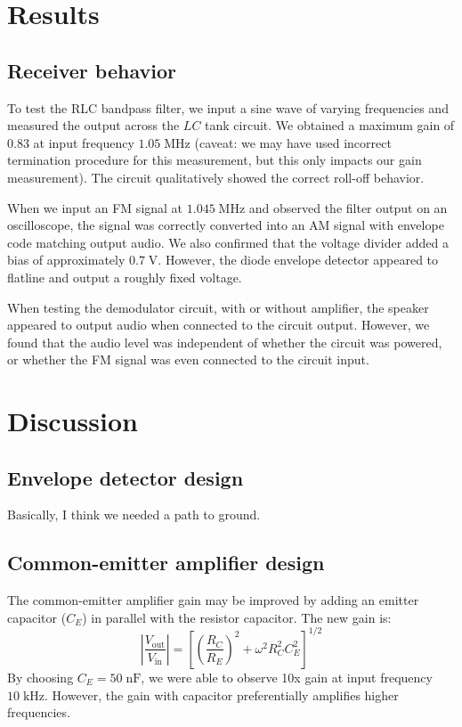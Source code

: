 \documentclass[11pt]{article}
\newcommand {\mt}{\mathrm}
\newcommand {\unit}[1]{\; \mt{#1}}
\begin{document}
\section{Results}

\subsection{Receiver behavior}

To test the RLC bandpass filter, we input a sine wave of varying frequencies
and measured the output across the $LC$ tank circuit.  We obtained a maximum
gain of $0.83$ at input frequency $1.05 \unit{MHz}$ (caveat: we may have used
incorrect termination procedure for this measurement, but this only impacts our
gain measurement).  The circuit qualitatively showed the correct roll-off
behavior.

When we input an FM signal at $1.045 \unit{MHz}$ and observed the
filter output on an oscilloscope, the signal was correctly converted into
an AM signal with envelope code matching output audio.  We also confirmed that
the voltage divider added a bias of approximately $0.7 \unit{V}$.
However, the diode envelope detector appeared to flatline and output a roughly
fixed voltage.

When testing the demodulator circuit, with or without amplifier, the speaker
appeared to output audio when connected to the circuit output.  However, we
found that the audio level was independent of whether the circuit was powered,
or whether the FM signal was even connected to the circuit input.


\section{Discussion}

\subsection{Envelope detector design}

Basically, I think we needed a path to ground.

\subsection{Common-emitter amplifier design}

The common-emitter amplifier gain may be improved by adding an emitter
capacitor ($C_E$) in parallel with the resistor capacitor.  The new gain is:
\[
  \left| \frac{V_\mt{out}}{V_\mt{in}} \right|
    = \left[ \left(\frac{R_C}{R_E}\right)^2
      + \omega^2 R_C^2 C_E^2 \right]^{1/2}
\]
By choosing $C_E = 50 \unit{nF}$, we were able to observe 10x gain at input
frequency $10 \unit{kHz}$.  However, the gain with capacitor preferentially
amplifies higher frequencies.
\end{document}
